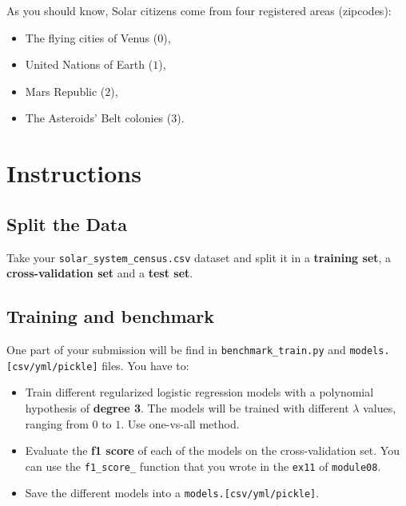 \documentclass{42-en}
\begin{document}
As you should know, Solar citizens come from four registered areas (zipcodes): 

\begin{itemize}
	\item The flying cities of Venus ($0$), 
	\item United Nations of Earth ($1$), 
	\item Mars Republic ($2$), 
	\item The Asteroids' Belt colonies ($3$).
\end{itemize}

\section*{Instructions}
\subsection*{Split the Data}

Take your \texttt{solar\_system\_census.csv} dataset and split it in a \textbf{training set}, a \textbf{cross-validation set}
and  a \textbf{test set}.

\subsection*{Training and benchmark}
One part of your submission will be find in \texttt{benchmark\_train.py} and \texttt{models.[csv/yml/pickle]} files.
You have to:
\begin{itemize}
  \item Train different regularized logistic regression models with a polynomial hypothesis of \textbf{degree 3}.
        The models will be trained with different $\lambda$ values, ranging from $0$ to $1$.
        Use one-vs-all method.
  \item Evaluate the \textbf{f1 score} of each of the models on the cross-validation set.
        You can use the \texttt{f1\_score\_} function that you wrote in the \texttt{ex11} of \texttt{module08}.
  \item Save the different models into a \texttt{models.[csv/yml/pickle]}.
\end{itemize}

\end{document}
